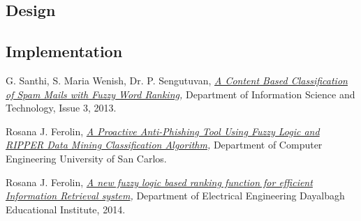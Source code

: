 \documentclass[a4paper]{article}
\begin{document}
\subsection{Design}


\subsection{Implementation}

%
%
\begin{thebibliography}{9}

    G. Santhi, S. Maria Wenish, Dr. P. Sengutuvan,
    \textit{
        \href{https://github.com/Menziess/Fuzzy-Logic-Email-Classification/raw/master/report/res/a_content_based_classification_of_spam_mails_with_fuzzy_word_ranking.pdf}{A Content Based Classification of Spam Mails with Fuzzy Word Ranking},
    }
    Department of Information Science and Technology,
    Issue 3,
    2013.

    Rosana J. Ferolin,
    \textit{
        \href{https://github.com/Menziess/Fuzzy-Logic-Email-Classification/raw/master/report/res/a_proactive_anti-phishing_tool_using_fuzzy_logic_and_ripper_data_mining_classification_algorithm.pdf}{A Proactive Anti-Phishing Tool Using Fuzzy Logic and RIPPER Data Mining Classification Algorithm},
    }
    Department of Computer Engineering University of San Carlos.

    Rosana J. Ferolin,
    \textit{
        \href{https://github.com/Menziess/Fuzzy-Logic-Email-Classification/raw/master/report/res/a_new_fuzzy_logic_based_ranking_function_for_efficient_information_retrieval_system.pdf}{A new fuzzy logic based ranking function for efficient Information Retrieval system},
    }
    Department of Electrical Engineering Dayalbagh Educational Institute,
    2014.

\end{thebibliography}
\end{document}
